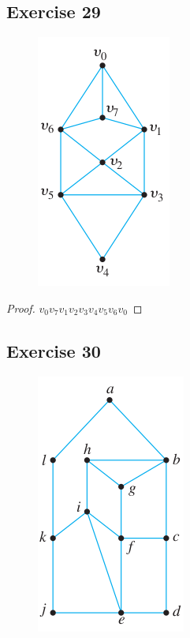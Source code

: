 \documentclass[14pt]{extarticle}
\begin{document}
\subsection{Exercise 29}
\begin{figure}[ht!]
    \centering
    \includegraphics[scale=0.7]{../images/10.1.29.png}
\end{figure}

\begin{proof}
    \(v_0 v_7 v_1 v_2 v_3 v_4 v_5 v_6 v_0\)
\end{proof}

\subsection{Exercise 30}
\begin{figure}[ht!]
    \centering
    \includegraphics[scale=0.5]{../images/10.1.30.png}
\end{figure}
\end{document}
